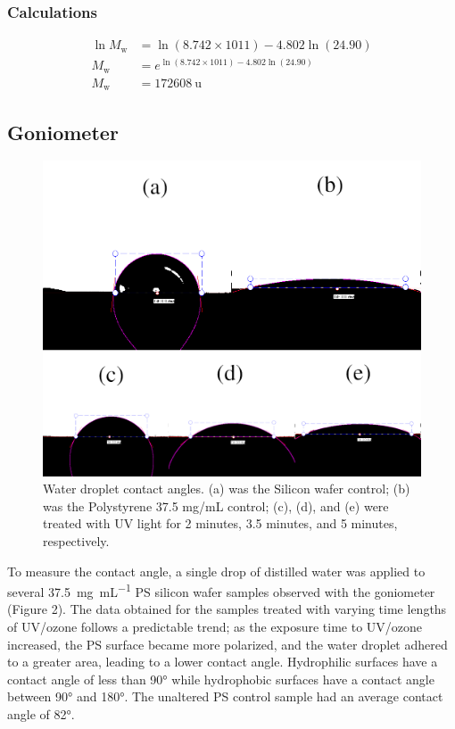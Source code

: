 \documentclass[twocolumn]{article}
\begin{document}
                \subsubsection{Calculations}
                \begin{align}
                    \ln{M_\text{w}} &= \ln{(8.742 \times 1011)} - 4.802 \ln{(24.90)}\\
                    M_\text{w} &= e^{\ln{(8.742 \times 1011)} - 4.802 \ln{(24.90)}} \nonumber\\
                    M_\text{w} &= \qty{172608}{\atomicmassunit} \nonumber
                \end{align}

            \subsection{Goniometer}
                \begin{figure}
                    \centering
                    \includegraphics[width=0.8\columnwidth]{img/contact.png}
                    \caption{Water droplet contact angles. (a) was the Silicon wafer control; (b) was the Polystyrene 37.5 mg/mL control; (c), (d), and (e) were treated with UV light for 2 minutes, 3.5 minutes, and 5 minutes, respectively.}\label{fig:contact}
                \end{figure}
                To measure the contact angle, a single drop of distilled water was applied to several \qty{37.5}{\milli\gram\per\milli\liter} PS silicon wafer samples observed with the goniometer (Figure 2). The data obtained for the samples treated with varying time lengths of UV/ozone follows a predictable trend; as the exposure time to UV/ozone increased, the PS surface became more polarized, and the water droplet adhered to a greater area, leading to a lower contact angle. Hydrophilic surfaces have a contact angle of less than 90° while hydrophobic surfaces have a contact angle between 90° and 180°. The unaltered PS control sample had an average contact angle of 82°.
\end{document}
